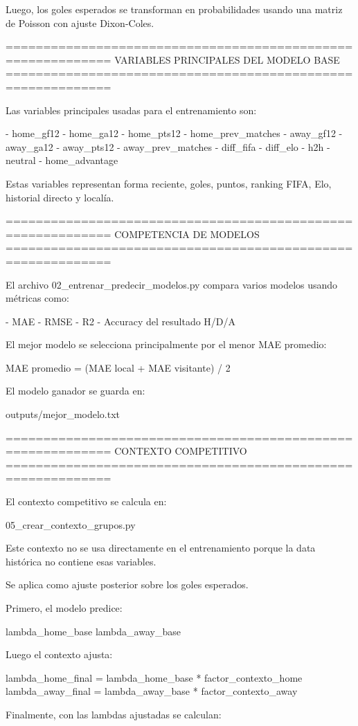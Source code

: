 Luego, los goles esperados se transforman en probabilidades usando una matriz de Poisson con ajuste Dixon-Coles.

============================================================
VARIABLES PRINCIPALES DEL MODELO BASE
============================================================

Las variables principales usadas para el entrenamiento son:

- home_gf12
- home_ga12
- home_pts12
- home_prev_matches
- away_gf12
- away_ga12
- away_pts12
- away_prev_matches
- diff_fifa
- diff_elo
- h2h
- neutral
- home_advantage

Estas variables representan forma reciente, goles, puntos, ranking FIFA, Elo, historial directo y localía.

============================================================
COMPETENCIA DE MODELOS
============================================================

El archivo 02_entrenar_predecir_modelos.py compara varios modelos usando métricas como:

- MAE
- RMSE
- R2
- Accuracy del resultado H/D/A

El mejor modelo se selecciona principalmente por el menor MAE promedio:

MAE promedio = (MAE local + MAE visitante) / 2

El modelo ganador se guarda en:

outputs/mejor_modelo.txt

============================================================
CONTEXTO COMPETITIVO
============================================================

El contexto competitivo se calcula en:

05_crear_contexto_grupos.py

Este contexto no se usa directamente en el entrenamiento porque la data histórica no contiene esas variables.

Se aplica como ajuste posterior sobre los goles esperados.

Primero, el modelo predice:

lambda_home_base
lambda_away_base

Luego el contexto ajusta:

lambda_home_final = lambda_home_base * factor_contexto_home
lambda_away_final = lambda_away_base * factor_contexto_away

Finalmente, con las lambdas ajustadas se calculan:

